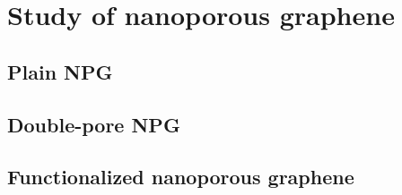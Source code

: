 
\chapter{Study of nanoporous graphene}

\label{ch3}

\section{Plain NPG}


\section{Double-pore NPG}


\section{Functionalized nanoporous graphene}

